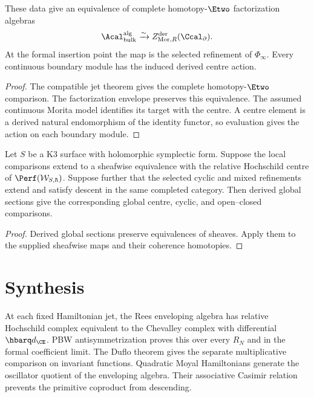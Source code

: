 \begin{theorem}
These data give an equivalence of complete homotopy-$\Etwo$ factorization algebras
\[
 \Acal_{\mathrm{bulk}}^{\mathrm{alg}}
 \xrightarrow{\sim}
 Z^{\mathrm{der}}_{\mathrm{Mor},R}(\Ccal_\partial).
\]
At the formal insertion point the map is the selected refinement of $\Phi_\infty$.
Every continuous boundary module has the induced derived centre action.
\end{theorem}
\begin{proof}
The compatible jet theorem gives the complete homotopy-$\Etwo$ comparison.
The factorization envelope preserves this equivalence.
The assumed continuous Morita model identifies its target with the centre.
A centre element is a derived natural endomorphism of the identity functor,
so evaluation gives the action on each boundary module.
\end{proof}

\begin{corollary}
Let $S$ be a K3 surface with holomorphic symplectic form.
Suppose the local comparisons extend to a sheafwise equivalence with the
relative Hochschild centre of $\Perf(\mathcal W_{S,\hbar})$.
Suppose further that the selected cyclic and mixed refinements extend
and satisfy descent in the same completed category.
Then derived global sections give the corresponding global centre,
cyclic, and open--closed comparisons.
\end{corollary}
\begin{proof}
Derived global sections preserve equivalences of sheaves.
Apply them to the supplied sheafwise maps and their coherence homotopies.
\end{proof}

\chapter{Synthesis}
At each fixed Hamiltonian jet, the Rees enveloping algebra has relative
Hochschild complex equivalent to the Chevalley complex with differential
$\hbarq d_{\CE}$.
PBW antisymmetrization proves this over every $R_N$ and in the formal coefficient limit.
The Duflo theorem gives the separate multiplicative comparison on invariant functions.
Quadratic Moyal Hamiltonians generate the oscillator quotient of the enveloping algebra.
Their associative Casimir relation prevents the primitive coproduct from descending.

